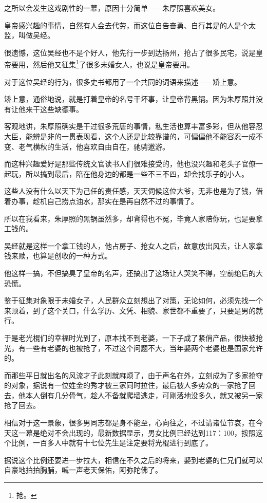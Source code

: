 \begin{multicols}{\theparacolNo}
		之所以会发生这戏剧性的一幕，原因十分简单——朱厚照喜欢美女。

		皇帝感兴趣的事情，自然有人会去代劳，而这位自告奋勇、自行其是的人是个太监，叫做吴经。

		很遗憾，这位吴经也不是个好人，他先行一步到达扬州，抢占了很多民宅，说是皇帝要用，然后他又征集\footnote{抢。}了很多未婚女人，也说是皇帝要用。

		对于这位吴经的行为，很多史书都用了一个共同的词语来描述——矫上意。

		矫上意，通俗地说，就是打着皇帝的名号干坏事，让皇帝背黑锅。因为朱厚照并没有让他来干这些缺德事。

		客观地讲，朱厚照确实是干过很多荒唐的事情，私生活也算丰富多彩，但从他容忍大臣，能辨是非的一贯表现看，这个人还是比较靠谱的，可偏偏他不能容忍一成不变、老气横秋的生活，他喜欢自由自在，驰骋遨游。

		而这种兴趣爱好是那些传统文官读书人们很难接受的，他也没兴趣和老头子官僚一起玩，所以搞到最后，陪在他身边的都是一些不三不四，却会找乐子的小人。

		这些人没有什么以天下为己任的责任感，天天伺候这位大爷，无非也是为了钱，借着办事，趁机自己捞点油水，那实在是再自然不过的事情了。

		所以在我看来，朱厚照的黑锅虽然多，却背得也不冤，毕竟人家陪你玩，也是要拿工钱的。

		吴经就是这样一个拿工钱的人，他占房子、抢女人之后，故意放出风去，让人家拿钱来赎，也算是创收的一种方式。

		他这样一搞，不但搞臭了皇帝的名声，还搞出了这场让人哭笑不得，空前绝后的大恐慌。

		鉴于征集对象限于未婚女子，人民群众立刻想出了对策，无论如何，必须先找一个来顶着，到了这个关口，什么学历、文凭、相貌、家世都不重要了，只要是男的就行。

		于是老光棍们的幸福时光到了，原本找不到老婆，一下子成了紧俏产品，很快被抢光，有一些有老婆的也被抢了，不过这个问题不大，当年娶两个老婆也是国家允许的。

		而那些平日就出名的风流才子此刻就麻烦了，由于声名在外，立刻成为了多家抢夺的对象，据说有一位姓金的秀才被三家同时拉住，最后被人多势众的一家抢了回去，他本人倒有几分骨气，趁人不备就爬墙逃走，可刚落地没多久，就又被另一家抢了回去。

		相信对于这一景象，很多男同志都是身不能至，心向往之，不过请诸位节哀，在今天这一幕是绝对不会出现的，最新数据显示，男女比例已经达到117：100，按照这个比例，一百多人中就有十七位先生是注定要将光棍进行到底了。

		据说这个比例还要进一步拉大，相信在不久之后的将来，娶到老婆的仁兄们就可以自豪地拍拍胸脯，喊一声老天保佑，阿弥陀佛了。


\end{multicols}
